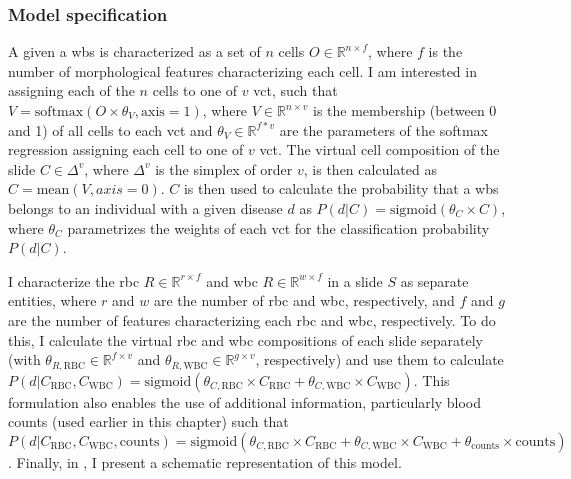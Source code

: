 \subsubsection{Model specification}

A given a \ac{wbs} is characterized as a set of $n$ cells $O \in \mathbb{R}^{n \times f}$, where $f$ is the number of morphological features characterizing each cell. I am interested in assigning each of the $n$ cells to one of $v$ \ac{vct}, such that $V = \mathrm{softmax}(O \times \theta_{V},\mathrm{axis}=1)$, where $V \in \mathbb{R}^{n \times v}$ is the membership (between 0 and 1) of all cells to each \ac{vct} and $\theta_{V} \in \mathbb{R}^{f * v}$ are the parameters of the softmax regression assigning each cell to one of $v$ \ac{vct}. The virtual cell composition of the slide $C \in \Delta^{v}$, where $\Delta^{v}$ is the simplex of order $v$, is then calculated as $C=\mathrm{mean}(V,axis=0)$. $C$ is then used to calculate the probability that a \ac{wbs} belongs to an individual with a given disease $d$ as $P(d|C) = \mathrm{sigmoid}(\theta_{C} \times C)$, where $\theta_C$ parametrizes the weights of each \ac{vct} for the classification probability $P(d|C)$.

I characterize the \ac{rbc} $R \in \mathbb{R}^{r \times f}$ and \ac{wbc} $R \in \mathbb{R}^{w \times f}$ in a slide $S$ as separate entities, where $r$ and $w$ are the number of \ac{rbc} and \ac{wbc}, respectively, and $f$ and $g$ are the number of features characterizing each \ac{rbc} and \ac{wbc}, respectively. To do this, I calculate the virtual \ac{rbc} and \ac{wbc} compositions of each slide separately (with $\theta_{R,\mathrm{RBC}} \in \mathbb{R}^{f \times v}$ and $\theta_{R,\mathrm{WBC}} \in \mathbb{R}^{g \times v}$, respectively) and use them to calculate $P(d|C_{\mathrm{RBC}},C_{\mathrm{WBC}}) = \mathrm{sigmoid}(\theta_{C,\mathrm{RBC}} \times C_{\mathrm{RBC}} + \theta_{C,\mathrm{WBC}} \times C_{\mathrm{WBC}})$. This formulation also enables the use of additional information, particularly blood counts (used earlier in this chapter) such that $P(d|C_{\mathrm{RBC}},C_{\mathrm{WBC}},\mathrm{counts}) = \mathrm{sigmoid}(\theta_{C,\mathrm{RBC}} \times C_{\mathrm{RBC}} + \theta_{C,\mathrm{WBC}} \times C_{\mathrm{WBC}} + \theta_{\mathrm{counts}} \times \mathrm{counts})$. Finally, in , I present a schematic representation of this model.

\begin{figure}[!ht]
    \label{fig:mile-vice-schematic}
\end{figure}

